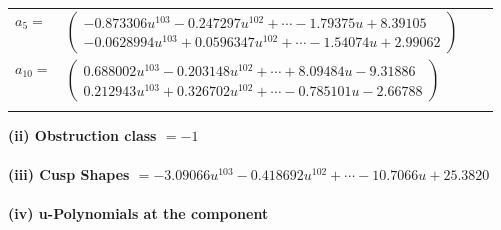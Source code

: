 \documentclass[1p]{elsarticle_modified}
\theoremstyle{definition}
\begin{document}
\begin{tabular}{m{7pt} m{180pt} m{7pt} m{180pt} }
\flushright $a_{5}=$&$\begin{pmatrix}-0.873306 u^{103}-0.247297 u^{102}+\cdots-1.79375 u+8.39105\\-0.0628994 u^{103}+0.0596347 u^{102}+\cdots-1.54074 u+2.99062\end{pmatrix}$ \\
\flushright $a_{10}=$&$\begin{pmatrix}0.688002 u^{103}-0.203148 u^{102}+\cdots+8.09484 u-9.31886\\0.212943 u^{103}+0.326702 u^{102}+\cdots-0.785101 u-2.66788\end{pmatrix}$\\&\end{tabular}
\flushleft \textbf{(ii) Obstruction class $= -1$}\\~\\
\flushleft \textbf{(iii) Cusp Shapes $= -3.09066 u^{103}-0.418692 u^{102}+\cdots-10.7066 u+25.3820$}\\~\\
\newpage\renewcommand{\arraystretch}{1}
\flushleft \textbf{(iv) u-Polynomials at the component}\newline \\
\end{document}
